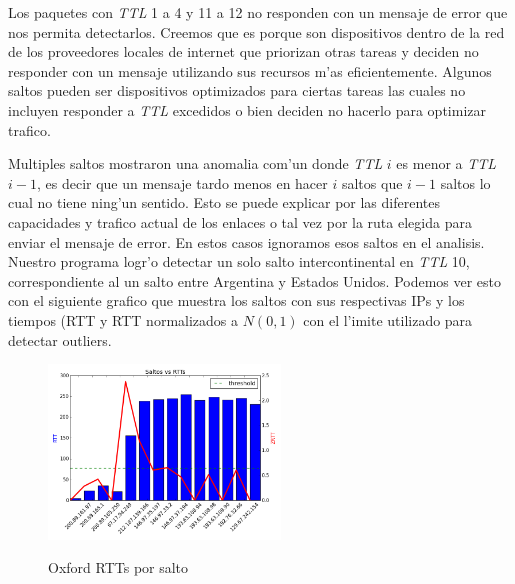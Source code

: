 \smallskip

Los paquetes con \textit{TTL} 1 a 4 y 11 a 12  no responden con un mensaje de error que nos permita detectarlos.
Creemos que es porque son dispositivos dentro de la red de los proveedores locales de internet que priorizan otras tareas y deciden no
responder con un mensaje utilizando sus recursos m'as eficientemente. Algunos saltos pueden ser dispositivos optimizados para ciertas tareas
las cuales no incluyen responder a \textit{TTL} excedidos o bien deciden no hacerlo para optimizar trafico. 

Multiples saltos mostraron una anomalia com'un donde \textit{TTL} $i$ es menor a \textit{TTL} $i-1$, es decir que un mensaje tardo menos en hacer $i$ saltos
que $i-1$ saltos lo cual no tiene ning'un sentido. Esto se puede explicar por las diferentes capacidades y trafico actual de los enlaces o tal vez por
la ruta elegida para enviar el mensaje de error. En estos casos ignoramos esos saltos en el analisis. \\

Nuestro programa logr'o detectar un solo salto intercontinental en \textit{TTL} 10, correspondiente al un salto entre Argentina y Estados Unidos.
Podemos ver esto con el siguiente grafico que muestra los saltos con sus respectivas IPs y los tiempos (RTT y RTT normalizados a $N(0,1)$ con el l'imite
utilizado para detectar outliers.
\begin{figure}[H]
\centering
\caption{Oxford RTTs por salto}
\includegraphics[width=0.55\textwidth]{modules/oxford_rtts}
 \label{fig:oxford_rtts}
\end{figure}


